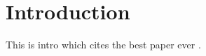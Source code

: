 \section{Introduction}
\label{sec:intro}

This is intro which cites the best paper ever \citep{vybornova2022automated}.